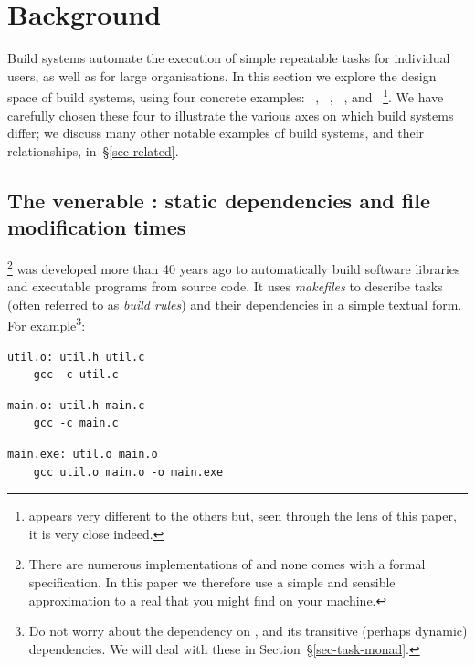 \section{Background}\label{sec-background}

Build systems automate the execution of simple repeatable tasks for individual
users, as well as for large organisations. In this section we explore the design
space of build systems, using four concrete examples:
\Make~\cite{feldman1979make}, \Shake~\cite{mitchell2012shake},
\Bazel~\cite{bazel}, and \Excel~\cite{advanced_excel}\footnote{\Excel appears
very different to the others but, seen through the lens of this paper, it is
very close indeed.}.
We have carefully chosen these four to illustrate the various axes on which build systems
differ; we discuss many other notable examples
of build systems, and their relationships,
in~\S\ref{sec-related}.

\subsection{The venerable \Make: static dependencies and file modification times}
\label{sec-background-make}

\Make\footnote{There are numerous implementations of \Make and none comes with a
formal specification. In this paper we therefore use a simple and sensible
approximation to a real \Make that you might find on your machine.} was developed
more than 40 years ago to automatically build software libraries and executable
programs from source code. It uses \emph{makefiles} to describe tasks (often
referred to as \emph{build rules}) and their dependencies in a simple textual form.
For example\footnote{Do not worry about the dependency on , and
its transitive (perhaps dynamic) dependencies.
We will deal with these in Section~\S\ref{sec-task-monad}.}:

\vspace{1mm}
\begin{verbatim}
util.o: util.h util.c
    gcc -c util.c
\end{verbatim}
\vspace{1mm}
\begin{verbatim}
main.o: util.h main.c
    gcc -c main.c
\end{verbatim}
\vspace{1mm}
\begin{verbatim}
main.exe: util.o main.o
    gcc util.o main.o -o main.exe
\end{verbatim}
\vspace{1mm}

